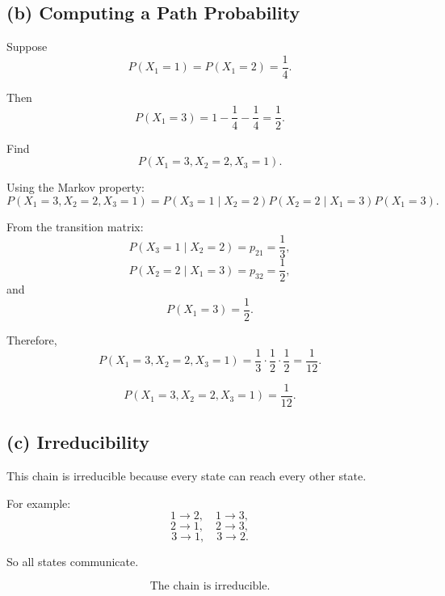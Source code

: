 \documentclass[12pt]{article}
\begin{document}
\begin{center}
\end{center}

\subsection*{(b) Computing a Path Probability}

Suppose
\[
P(X_1=1)=P(X_1=2)=\frac14.
\]

Then
\[
P(X_1=3)=1-\frac14-\frac14=\frac12.
\]

Find
\[
P(X_1=3,X_2=2,X_3=1).
\]

Using the Markov property:
\[
P(X_1=3,X_2=2,X_3=1)
=
P(X_3=1\mid X_2=2)P(X_2=2\mid X_1=3)P(X_1=3).
\]

From the transition matrix:
\[
P(X_3=1\mid X_2=2)=p_{21}=\frac13,
\]
\[
P(X_2=2\mid X_1=3)=p_{32}=\frac12,
\]
and
\[
P(X_1=3)=\frac12.
\]

Therefore,
\[
P(X_1=3,X_2=2,X_3=1)
=
\frac13\cdot\frac12\cdot\frac12
=
\frac{1}{12}.
\]

\[
\boxed{P(X_1=3,X_2=2,X_3=1)=\frac{1}{12}.}
\]

\subsection*{(c) Irreducibility}

This chain is irreducible because every state can reach every other state.

For example:
\[
1\to 2,\quad 1\to 3,
\]
\[
2\to 1,\quad 2\to 3,
\]
\[
3\to 1,\quad 3\to 2.
\]

So all states communicate.

\[
\boxed{\text{The chain is irreducible.}}
\]
\end{document}
